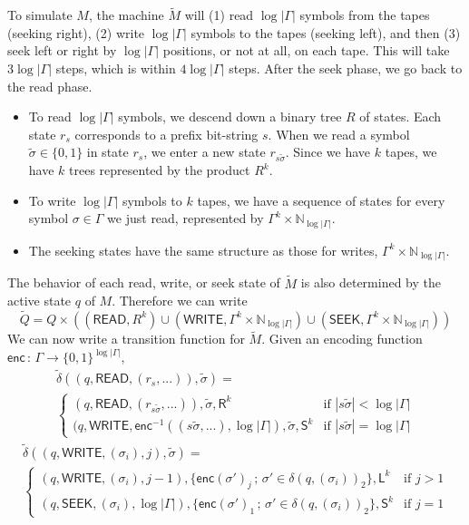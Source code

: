 \documentclass[12pt]{article}
\begin{document}
To simulate $M$, the machine $\tilde{M}$ will (1) read $\log|\Gamma|$ symbols from the tapes (seeking right), (2) write $\log|\Gamma|$ symbols to the tapes (seeking left), and then (3) seek left or right by $\log|\Gamma|$ positions, or not at all, on each tape. This will take $3\log|\Gamma|$ steps, which is within $4\log|\Gamma|$ steps. After the seek phase, we go back to the read phase.
\begin{itemize}
\item{To read $\log|\Gamma|$ symbols, we descend down a binary tree $R$ of states. Each state $r_s$ corresponds to a prefix bit-string $s$. When we read a symbol $\tilde{\sigma} \in \{0,1\}$ in state $r_s$, we enter a new state $r_{s\tilde{\sigma}}$. Since we have $k$ tapes, we have $k$ trees represented by the product $R^k$.}
\item{To write $\log|\Gamma|$ symbols to $k$ tapes, we have a sequence of states for every symbol $\sigma \in \Gamma$ we just read, represented by $\Gamma^k \times \mathbb{N}_{\log|\Gamma|}$.}
\item{The seeking states have the same structure as those for writes, $\Gamma^k \times \mathbb{N}_{\log|\Gamma|}$.}
\end{itemize}
The behavior of each read, write, or seek state of $\tilde{M}$ is also determined by the active state $q$ of $M$. Therefore we can write
$$
\tilde{Q} = Q \times \left(
(\textsf{READ}, R^k) \cup
(\textsf{WRITE}, \Gamma^k \times \mathbb{N}_{\log|\Gamma|}) \cup
(\textsf{SEEK}, \Gamma^k \times \mathbb{N}_{\log|\Gamma|})
\right)
$$
We can now write a transition function for $\tilde{M}$. Given an encoding function $\textsf{enc} \,:\, \Gamma \rightarrow \{0,1\}^{\log|\Gamma|}$,
\begin{multline*}
\tilde{\delta}
((q, \textsf{READ}, (r_{s}, ...)), \tilde{\sigma}) = \\
\begin{cases}
(q, \textsf{READ}, (r_{s\tilde{\sigma}}, ...)), \tilde{\sigma}, \textsf{R}^k &
\text{if } |s\tilde{\sigma}| < \log|\Gamma| \\
(q, \textsf{WRITE}, \textsf{enc}^{-1}((s\tilde{\sigma}, ...), \log|\Gamma|), \tilde{\sigma}, \textsf{S}^k &
\text{if } |s\tilde{\sigma}| = \log|\Gamma|
\end{cases}
\end{multline*}
\begin{multline*}
\tilde{\delta}
((q, \textsf{WRITE}, (\sigma_i), j), \tilde{\sigma}) = \\
\begin{cases}
(q, \textsf{WRITE}, (\sigma_i), j-1), \{ \textsf{enc}(\sigma')_j \,;\, \sigma' \in \delta(q,(\sigma_i))_2 \}, \textsf{L}^k &
\text{if } j > 1 \\
(q, \textsf{SEEK}, (\sigma_i), \log|\Gamma|), \{ \textsf{enc}(\sigma')_1 \,;\, \sigma' \in \delta(q,(\sigma_i))_2 \}, \textsf{S}^k &
\text{if } j = 1
\end{cases}
\end{multline*}
\end{document}
